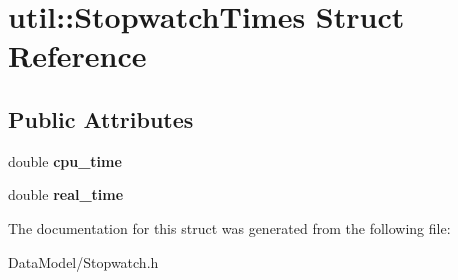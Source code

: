 \hypertarget{structutil_1_1StopwatchTimes}{\section{util\-:\-:Stopwatch\-Times Struct Reference}
\label{structutil_1_1StopwatchTimes}
}
\subsection*{Public Attributes}
\begin{DoxyCompactItemize}
\item 
\hypertarget{structutil_1_1StopwatchTimes_a68365275892059625a081254a139c364}{double {\bfseries cpu\-\_\-time}}\label{structutil_1_1StopwatchTimes_a68365275892059625a081254a139c364}

\item 
\hypertarget{structutil_1_1StopwatchTimes_a5b25389a70f2b9a60e0f031353bff789}{double {\bfseries real\-\_\-time}}\label{structutil_1_1StopwatchTimes_a5b25389a70f2b9a60e0f031353bff789}

\end{DoxyCompactItemize}


The documentation for this struct was generated from the following file\-:\begin{DoxyCompactItemize}
\item 
Data\-Model/Stopwatch.\-h\end{DoxyCompactItemize}
